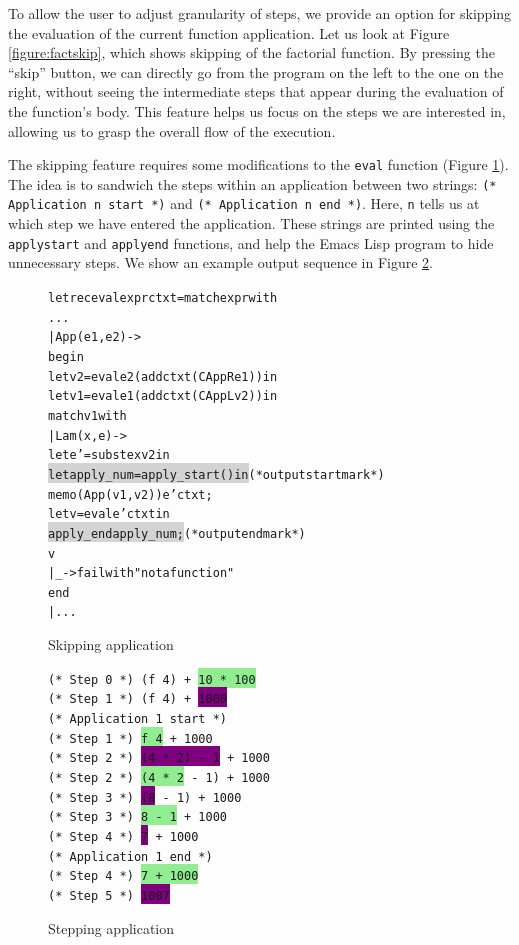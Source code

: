 To allow the user to adjust granularity of steps, we provide an option for skipping the evaluation of the current function application.  Let us look at Figure \ref{figure:factskip}, which shows skipping of the factorial function.  By pressing the ``skip'' button, we can directly go from the program on the left to the one on the right, without seeing the intermediate steps that appear during the evaluation of the function's body.  This feature helps us focus on the steps we are interested in, allowing us to grasp the overall flow of the execution.

The skipping feature requires some modifications to the \texttt{eval} function (Figure \ref{figure:skipapp}).  The idea is to sandwich the steps within an application between two strings: \texttt{(* Application n start *)} and \texttt{(* Application n end *)}.  Here, \texttt{n} tells us at which step we have entered the application.  These strings are printed using the \texttt{apply\US start} and \texttt{apply\US end} functions, and help the Emacs Lisp program to hide unnecessary steps.  We show an example output sequence in Figure \ref{figure:skipping}.


\begin{figure}
\begin{alltt}
let rec eval expr ctxt = match expr with
    ...
  | App (e1, e2) ->
    begin
      let v2 = eval e2 (add ctxt (CAppR e1)) in
      let v1 = eval e1 (add ctxt (CAppL v2)) in
      match v1 with
      | Lam (x, e) ->
        let e' = subst e x v2 in
        \colorbox{lightgray}{let apply_num = apply_start () in}                (* output start mark *)
        memo (App (v1, v2)) e' ctxt;
        let v = eval e' ctxt in
        \colorbox{lightgray}{apply_end apply_num;}                               (* output end mark *)
        v
      | _ -> failwith "not a function"
    end
  | ...
\end{alltt}
\caption{Skipping application}
\label{figure:skipapp}
\end{figure}

\begin{figure}
\texttt{(* Step 0 *) (f 4) + \colorbox{lightgreen}{10 * 100}\\
(* Step 1 *) (f 4) + \colorbox{purple}{1000}\\
(* Application 1 start *)\\
(* Step 1 *) \colorbox{lightgreen}{f 4} + 1000\\
(* Step 2 *) \colorbox{purple}{(4 * 2) - 1} + 1000\\
(* Step 2 *) \colorbox{lightgreen}{(4 * 2} - 1) + 1000\\
(* Step 3 *) \colorbox{purple}{(8} - 1) + 1000\\
(* Step 3 *) \colorbox{lightgreen}{8 - 1} + 1000\\
(* Step 4 *) \colorbox{purple}{7} + 1000\\
(* Application 1 end *)\\
(* Step 4 *) \colorbox{lightgreen}{7 + 1000}\\
(* Step 5 *) \colorbox{purple}{1007}}
\caption{Stepping application}
\label{figure:skipping}
\end{figure}
